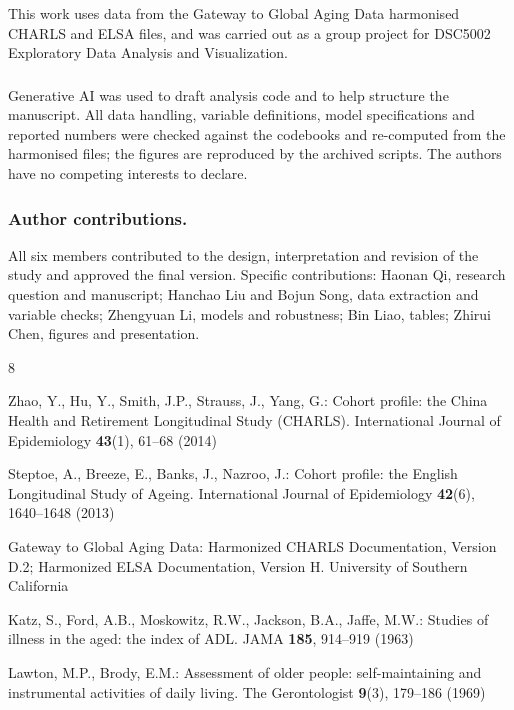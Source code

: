 \documentclass[runningheads]{llncs}
\begin{document}
\begin{credits}
\subsubsection{\ackname}
This work uses data from the Gateway to Global Aging Data harmonised CHARLS and ELSA files, and was carried out as a group project for DSC5002 Exploratory Data Analysis and Visualization.

\subsubsection{\discintname}
Generative AI was used to draft analysis code and to help structure the manuscript. All data handling, variable definitions, model specifications and reported numbers were checked against the codebooks and re-computed from the harmonised files; the figures are reproduced by the archived scripts. The authors have no competing interests to declare.

\subsubsection{Author contributions.}
All six members contributed to the design, interpretation and revision of the study and approved the final version. Specific contributions: Haonan Qi, research question and manuscript; Hanchao Liu and Bojun Song, data extraction and variable checks; Zhengyuan Li, models and robustness; Bin Liao, tables; Zhirui Chen, figures and presentation.
\end{credits}

\begin{thebibliography}{8}

Zhao, Y., Hu, Y., Smith, J.P., Strauss, J., Yang, G.: Cohort profile: the China Health and Retirement Longitudinal Study (CHARLS). International Journal of Epidemiology \textbf{43}(1), 61--68 (2014)

Steptoe, A., Breeze, E., Banks, J., Nazroo, J.: Cohort profile: the English Longitudinal Study of Ageing. International Journal of Epidemiology \textbf{42}(6), 1640--1648 (2013)

Gateway to Global Aging Data: Harmonized CHARLS Documentation, Version D.2; Harmonized ELSA Documentation, Version H. University of Southern California

Katz, S., Ford, A.B., Moskowitz, R.W., Jackson, B.A., Jaffe, M.W.: Studies of illness in the aged: the index of ADL. JAMA \textbf{185}, 914--919 (1963)

Lawton, M.P., Brody, E.M.: Assessment of older people: self-maintaining and instrumental activities of daily living. The Gerontologist \textbf{9}(3), 179--186 (1969)

\end{thebibliography}
\end{document}
